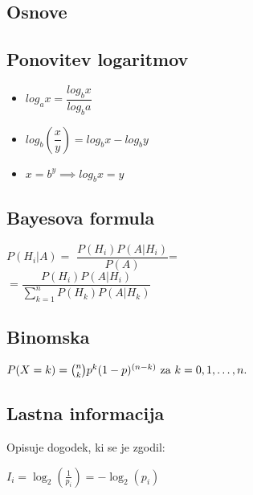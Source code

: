 \documentclass{article}
\begin{document}
\begin{multicols}{4}

	\section{Osnove}
	

	\subsection{Ponovitev logaritmov}
	\begin{small}
		\begin{itemize}
			\item $log_a x = \dfrac{log_b x}{log_b a}$
			\item $log_b(\dfrac{x}{y}) = log_b x - log_b y$
			\item $x = b^y \implies log_b x = y$
		\end{itemize}
	\end{small}

	\subsection{Bayesova formula}
	\begin{center}
		\begin{math}
			P(H_{i} | A) =
		\end{math}
		\begin{math}
			\dfrac{P(H_{i}) P(A | H_{i})}{P(A)}
		\end{math}=\\
		\begin{math}
			= \dfrac{P(H_{i}) P(A | H_{i})}{\sum_{k=1}^{n} P(H_{k}) P(A | H_{k})}
		\end{math}
	\end{center}

	\subsection{Binomska}
	\begin{center}
		\begin{math}
			P(X = k) = {n \choose k} p^{k} (1 - p)^{(n - k)}$ za $k = 0,1, \dots, n.
		\end{math}
	\end{center}

	\subsection{Lastna informacija}
	Opisuje dogodek, ki se je zgodil:
	\begin{center}
		\begin{math}
			I_i = \log_2(\frac{1}{p_i}) = - \log_2(p_i)
		\end{math}
	\end{center}


\end{multicols}
\end{document}
